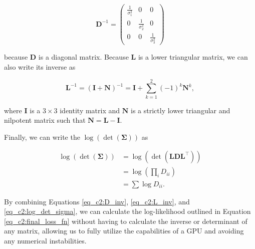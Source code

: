 \begin{equation}
\boldsymbol{D}^{-1}=\left(\begin{array}{ccc}
\frac{1}{\sigma_{1}^{2}} & 0 & 0 \\
0 & \frac{1}{\sigma_{2}^{2}} & 0 \\
0 & 0 & \frac{1}{\sigma_{3}^{2}}
\end{array}\right)
\label{eq_c2:D_inv}
\end{equation}

\noindent
because $\boldsymbol{D}$ is a diagonal matrix. Because $\boldsymbol{L}$ is a lower triangular matrix, we can also write its inverse as  

\begin{equation}
\boldsymbol{L}^{-1}=(\boldsymbol{I}+\boldsymbol{N})^{-1}= \boldsymbol{I} +\sum_{k=1}^{2}(-1)^{k} \boldsymbol{N}^{k} ,
\label{eq_c2:L_inv}
\end{equation}

\noindent
where $\boldsymbol{I}$ is a $3\times3$ identity matrix and $\boldsymbol{N}$ is a strictly lower triangular and nilpotent matrix such that $\boldsymbol{N} = \boldsymbol{L} - \boldsymbol{I}$.

Finally, we can write the $\log (\operatorname{det}(\boldsymbol{\Sigma}))$ as

\begin{equation}
\begin{split}
\log (\operatorname{det}(\boldsymbol{\Sigma})) 
& = \log (\operatorname{det} (\boldsymbol{L}\boldsymbol{D}\boldsymbol{L}^{\top})) \\
& = \log (\prod_i D_{ii}) \\
& = \sum \log D_{ii} .
\end{split}
\label{eq_c2:log_det_sigma}
\end{equation}

\noindent
By combining Equations \ref{eq_c2:D_inv}, \ref{eq_c2:L_inv}, and \ref{eq_c2:log_det_sigma}, we can calculate the log-likelihood outlined in Equation \ref{eq_c2:final_loss_fn} without having to calculate the inverse or determinant of any matrix, allowing us to fully utilize the capabilities of a GPU and avoiding any numerical instabilities. 

